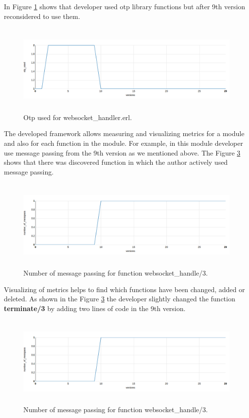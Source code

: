 In Figure \ref{fig:chat2} shows that developer used otp library functions but after 9th version reconsidered to use them.

\begin{figure}[h]
	\centering
	\includegraphics[height=45mm]{figures/chat2.png}
	\caption{Otp used for websocket\_handler.erl.}
	\label{fig:chat2}
\end{figure}

The developed framework allows measuring and visualizing metrics for a module and also for each function in the module. For example, in this module developer use message passing from the 9th version as we mentioned above. The Figure \ref{fig:chat3} shows that there was discovered function in which the author actively used message passing.

\begin{figure}[h]
	\centering
	\includegraphics[height=45mm]{figures/chat3.png}
	\caption{Number of message passing for function websocket\_handle/3.}
	\label{fig:chat3}
\end{figure}

Visualizing of metrics helps to find which functions have been changed, added or deleted. As shown in the Figure \ref{fig:chat3} the developer slightly changed the function \textbf{terminate/3} by adding two lines of code in the 9th version.

\begin{figure}[h]
	\centering
	\includegraphics[height=45mm]{figures/chat3.png}
	\caption{
		Number of message passing for function websocket\_handle/3.}
	\label{fig:chat3}
\end{figure}
 
